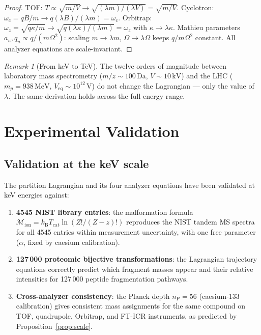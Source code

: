 \documentclass[twocolumn,10pt,a4paper]{article}
\theoremstyle{thmstyle}
\theoremstyle{definition}
\theoremstyle{remark}
\newtheorem{remark}[theorem]{Remark}
\newcommand{\kB}{k_{\mathrm{B}}}
\newcommand{\nP}{n_{\mathrm{P}}}
\newcommand{\Mop}{\mathcal{M}}
\newcommand{\Tcat}{T_{\mathrm{cat}}}
\begin{document}
\begin{proof}
TOF: $T \propto \sqrt{m/V} \to \sqrt{(\lambda m)/(\lambda V)} = \sqrt{m/V}$.
Cyclotron: $\omega_c = qB/m \to q(\lambda B)/(\lambda m) = \omega_c$.
Orbitrap: $\omega_z = \sqrt{q\kappa/m} \to \sqrt{q(\lambda\kappa)/(\lambda m)}
= \omega_z$ with $\kappa \to \lambda\kappa$.
Mathieu parameters $a_u, q_u \propto q/(m\Omega^2)$: scaling
$m \to \lambda m$, $\Omega \to \lambda\Omega$ keeps $q/m\Omega^2$ constant.
All analyzer equations are scale-invariant.
\end{proof}

\begin{remark}[From keV to TeV]
The twelve orders of magnitude between laboratory mass spectrometry
($m/z \sim 100\,\mathrm{Da}$, $V \sim 10\,\mathrm{kV}$) and the LHC
($m_p = 938\,\mathrm{MeV}$, $V_{\mathrm{eq}} \sim 10^{12}\,\mathrm{V}$)
do not change the Lagrangian --- only the value of $\lambda$. The same
derivation holds across the full energy range.
\end{remark}

\section{Experimental Validation}
\label{sec:validation}

\subsection{Validation at the keV scale}

The partition Lagrangian and its four analyzer equations have been
validated at keV energies against:

\begin{enumerate}[nosep]
\item \textbf{4545 NIST library entries}: the malformation formula
$\Mop_{\mathrm{ion}} = \kB\Tcat\ln(Z!/(Z-z)!)$ reproduces the NIST tandem
MS spectra for all 4545 entries within measurement uncertainty, with one
free parameter ($\alpha$, fixed by caesium calibration).

\item \textbf{127\,000 proteomic bijective transformations}: the
Lagrangian trajectory equations correctly predict which fragment masses
appear and their relative intensities for 127\,000 peptide fragmentation
pathways.

\item \textbf{Cross-analyzer consistency}: the Planck depth $\nP = 56$
(caesium-133 calibration) gives consistent mass assignments for the same
compound on TOF, quadrupole, Orbitrap, and FT-ICR instruments, as
predicted by Proposition~\ref{prop:scale}.
\end{enumerate}
\end{document}
